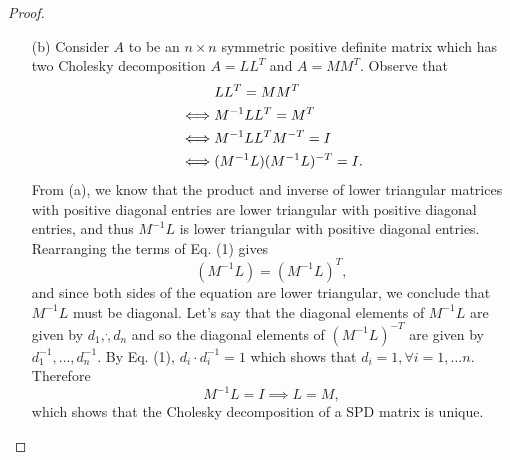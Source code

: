 \documentclass[12pt]{report}
\begin{document}
\begin{problem}
\begin{proof}
\begin{enumerate}
    \item [(b)] Consider $A$ to be an $n \times n$ symmetric positive definite matrix which has two Cholesky decomposition $A = LL^T$ and $A = MM^T$. Observe that
    \begin{align}
        &LL^T = MM^T \notag\\ 
        \iff &M^{-1}LL^T = M^T \notag\\
        \iff &M^{-1}LL^TM^{-T} =I \notag\\
        \iff &(M^{-1}L)(M^{-1}L)^{-T} = I . 
    \end{align}
    From (a), we know that the product and inverse of lower triangular matrices with positive diagonal entries are lower triangular with positive diagonal entries, and thus $M^{-1}L$ is lower triangular with positive diagonal entries. Rearranging the terms of Eq. (1) gives
    \[
        (M^{-1}L) = (M^{-1}L)^{T},
    \]
     and since both sides of the equation are lower triangular, we conclude that $M^{-1}L$ must be diagonal. Let's say that the diagonal elements of $M^{-1}L$ are given by $d_1,\dot,d_n$ and so the diagonal elements of $(M^{-1}L)^{-T}$ are given by $d_1^{-1}, \dots, d_n^{-1}$. By Eq. (1), $d_i\cdot d_i^{-1} = 1$ which shows that $d_i = 1,  \forall i = 1, \dots n$. Therefore
     \[
         M^{-1}L = I \implies L = M,
     \]
    which shows that the Cholesky decomposition of a SPD matrix is unique.

\end{enumerate}

\end{proof}
\end{problem}


\end{document}
